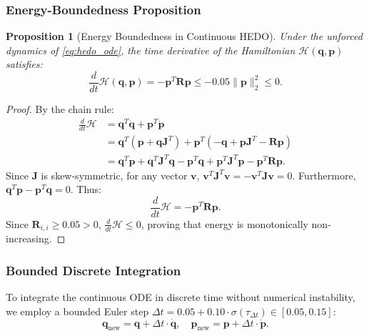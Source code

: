 \documentclass[10pt,journal,final]{IEEEtran}
\newtheorem{proposition}{Proposition}
\begin{document}
\subsubsection{Energy-Boundedness Proposition}
\begin{proposition}[Energy Boundedness in Continuous HEDO]
Under the unforced dynamics of \eqref{eq:hedo_ode}, the time derivative of the Hamiltonian $\mathcal{H}(\mathbf{q}, \mathbf{p})$ satisfies:
\begin{equation}
\frac{d}{dt}\mathcal{H}(\mathbf{q}, \mathbf{p}) = -\mathbf{p}^T \mathbf{R} \mathbf{p} \le -0.05 \|\mathbf{p}\|_2^2 \le 0.
\end{equation}
\end{proposition}
\begin{proof}
By the chain rule:
\begin{align}
\frac{d}{dt}\mathcal{H} &= \mathbf{q}^T \dot{\mathbf{q}} + \mathbf{p}^T \dot{\mathbf{p}} \nonumber \\
&= \mathbf{q}^T (\mathbf{p} + \mathbf{q} \mathbf{J}^T) + \mathbf{p}^T (-\mathbf{q} + \mathbf{p} \mathbf{J}^T - \mathbf{R} \mathbf{p}) \nonumber \\
&= \mathbf{q}^T \mathbf{p} + \mathbf{q}^T \mathbf{J}^T \mathbf{q} - \mathbf{p}^T \mathbf{q} + \mathbf{p}^T \mathbf{J}^T \mathbf{p} - \mathbf{p}^T \mathbf{R} \mathbf{p}.
\end{align}
Since $\mathbf{J}$ is skew-symmetric, for any vector $\mathbf{v}$, $\mathbf{v}^T \mathbf{J}^T \mathbf{v} = -\mathbf{v}^T \mathbf{J} \mathbf{v} = 0$. Furthermore, $\mathbf{q}^T \mathbf{p} - \mathbf{p}^T \mathbf{q} = 0$. Thus:
\begin{equation}
\frac{d}{dt}\mathcal{H} = -\mathbf{p}^T \mathbf{R} \mathbf{p}.
\end{equation}
Since $\mathbf{R}_{i,i} \ge 0.05 > 0$, $\frac{d}{dt}\mathcal{H} \le 0$, proving that energy is monotonically non-increasing.
\end{proof}

\subsubsection{Bounded Discrete Integration}
To integrate the continuous ODE in discrete time without numerical instability, we employ a bounded Euler step $\Delta t = 0.05 + 0.10 \cdot \sigma(\tau_{\Delta t}) \in [0.05, 0.15]$:
\begin{equation}
\label{eq:euler_step}
\mathbf{q}_{\mathrm{new}} = \mathbf{q} + \Delta t \cdot \dot{\mathbf{q}}, \quad \mathbf{p}_{\mathrm{new}} = \mathbf{p} + \Delta t \cdot \dot{\mathbf{p}}.
\end{equation}
\end{document}
